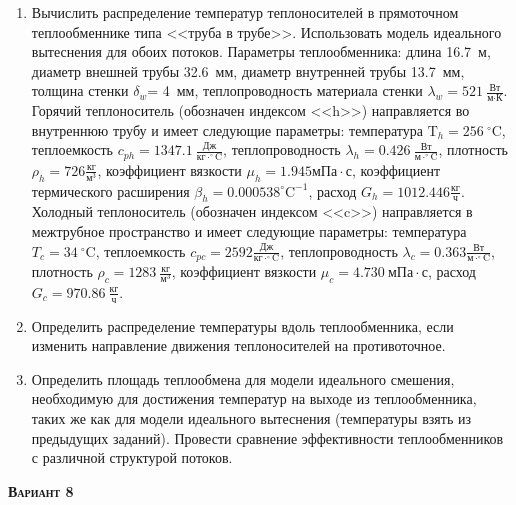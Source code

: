 \begin{enumerate} 
\item Вычислить распределение температур теплоносителей в прямоточном теплообменнике типа <<труба в трубе>>. Использовать модель идеального вытеснения для обоих потоков. Параметры теплообменника: длина  16.7~м, диаметр внешней трубы 32.6~мм,  диаметр внутренней трубы 13.7~мм, толщина стенки $\delta_{w}$=     4~мм,  теплопроводность материала стенки $\lambda_{w}=  521~\frac{\text{Вт}}{\text{м} \cdot \text{К}}$.  Горячий теплоноситель (обозначен индексом <<h>>) направляется во внутреннюю трубу и	 имеет следующие параметры: температура $\text{T}_{h}= 256~^\circ\mathrm{C}$, теплоемкость	  $c_{p{h}}= 1347.1~\frac{\text{Дж}}{\text{кг} \cdot ^\circ\mathrm{C}}$, теплопроводность 		$\lambda_{h}= 0.426~\frac{\text{Вт}}{\text{м} \cdot ^\circ\mathrm{C}}$, плотность 		$\rho_{h}=  726 \frac{\text{кг}}{\text{м}^3}$, коэффициент вязкости $\mu_{h}=1.945 \text{мПа} 		\cdot \text{с} $, коэффициент термического расширения $\beta_{h}=0.000538 ^\circ\mathrm{C}^{-1}$,		 расход $G_{h}= 1012.446 \frac{\text{кг}}{\text{ч}}$. Холодный теплоноситель (обозначен индексом <<c>>) 		 направляется в межтрубное пространство и имеет следующие параметры: температура $T_{c}=   34		 ~^\circ\mathrm{C}$, теплоемкость $c_{p{c}}= 2592 \frac{\text{Дж}}{\text{кг} \cdot ^\circ\mathrm{C}}$,			 теплопроводность $\lambda_{c}=0.363 \frac{\text{Вт}}{\text{м} \cdot ^\circ\mathrm{C}}$, плотность 			 $\rho_{c}=  1283~\frac{\text{кг}}{\text{м}^3}$, коэффициент вязкости $\mu_{c}=4.730~\text{мПа} \cdot \text{с} $, 			 расход $G_{c}=970.86~\frac{\text{кг}}{\text{ч}}$. 

\item Определить распределение температуры вдоль теплообменника, если 	изменить направление движения теплоносителей на противоточное.

\item Определить площадь теплообмена для модели идеального смешения, необходимую для достижения 	температур на выходе из теплообменника, таких же как для модели идеального вытеснения (температуры взять из предыдущих заданий).	Провести сравнение эффективности теплообменников с различной структурой потоков.

\end{enumerate}

\textsc{\textbf{Вариант 8}}

